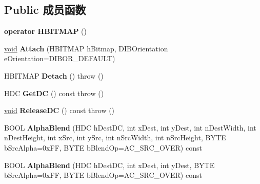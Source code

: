 \subsection*{Public 成员函数}
\begin{DoxyCompactItemize}
\item 
\mbox{\label{class_a_t_l_1_1_c_image_a976492a58d6e0eac8010973aa80ef5a2}} 
{\bfseries operator H\+B\+I\+T\+M\+AP} ()
\item 
\mbox{\label{class_a_t_l_1_1_c_image_a077b963263fa3708df95fe29090d5886}} 
\hyperlink{interfacevoid}{void} {\bfseries Attach} (H\+B\+I\+T\+M\+AP h\+Bitmap, D\+I\+B\+Orientation e\+Orientation=D\+I\+B\+O\+R\+\_\+\+D\+E\+F\+A\+U\+LT)
\item 
\mbox{\label{class_a_t_l_1_1_c_image_a8237e4e5114954d1f53f6455bcf91b2f}} 
H\+B\+I\+T\+M\+AP {\bfseries Detach} ()  throw ()
\item 
\mbox{\label{class_a_t_l_1_1_c_image_a6c6935be815d88716a2fe3a10d398db8}} 
H\+DC {\bfseries Get\+DC} () const  throw ()
\item 
\mbox{\label{class_a_t_l_1_1_c_image_a99460fbf76b878e8b66dd05cdac05180}} 
\hyperlink{interfacevoid}{void} {\bfseries Release\+DC} () const  throw ()
\item 
\mbox{\label{class_a_t_l_1_1_c_image_a1c9311117156b20f9a77223c568c3c6f}} 
B\+O\+OL {\bfseries Alpha\+Blend} (H\+DC h\+Dest\+DC, int x\+Dest, int y\+Dest, int n\+Dest\+Width, int n\+Dest\+Height, int x\+Src, int y\+Src, int n\+Src\+Width, int n\+Src\+Height, B\+Y\+TE b\+Src\+Alpha=0x\+F\+F, B\+Y\+T\+E b\+Blend\+Op=\+A\+C\+\_\+\+S\+R\+C\+\_\+\+O\+V\+E\+R) const
\item 
\mbox{\label{class_a_t_l_1_1_c_image_afbc35d8c7e3dec47fae197b118dd18d0}} 
B\+O\+OL {\bfseries Alpha\+Blend} (H\+DC h\+Dest\+DC, int x\+Dest, int y\+Dest, B\+Y\+TE b\+Src\+Alpha=0x\+F\+F, B\+Y\+T\+E b\+Blend\+Op=\+A\+C\+\_\+\+S\+R\+C\+\_\+\+O\+V\+E\+R) const
\item 
\mbox{\label{class_a_t_l_1_1_c_image_a309f54bc56e6d35bba705a2385607429}} 

\end{DoxyCompactItemize}
